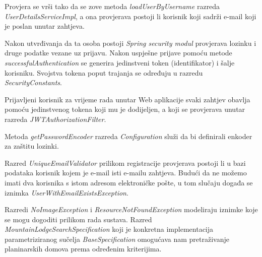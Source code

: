 			 Provjera se vrši tako da se zove metoda \textit{loadUserByUsername} razreda \textit{UserDetailsServiceImpl}, a ona provjerava postoji li korisnik koji sadrži e-mail koji je poslan unutar zahtjeva. 
			 
			 Nakon utvrđivanja da ta osoba postoji \textit{Spring security modul} provjerava lozinku i druge podatke vezane uz prijavu. Nakon uspješne prijave pomoću metode \textit{successfulAuthentication} se generira jedinstveni token (identifikator) i šalje korisniku. Svojstva tokena poput trajanja se određuju u razredu \textit{SecurityConstants}. 
			
			Prijavljeni korisnik za vrijeme rada unutar Web aplikacije svaki zahtjev obavlja pomoću jedinstvenog tokena koji mu je dodijeljen, a koji se provjerava unutar razreda \textit{JWTAuthorizationFilter}. 
			
			Metoda \textit{getPasswordEncoder} razreda \textit{Configuration} služi da bi definirali enkoder za zaštitu lozinki. 
			
			Razred \textit{UniqueEmailValidator} prilikom registracije provjerava postoji li u bazi podataka korisnik kojem je e-mail isti e-mailu zahtjeva. Budući da ne možemo imati dva korisnika s istom adresom elektroničke pošte, u tom slučaju događa se iznimka \textit{UserWithEmailExistsException}.  
			
			Razredi \textit{NoImageException} i \textit{ResourceNotFoundException} modeliraju iznimke koje se mogu dogoditi prilikom rada sustava.
			Razred \textit{MountainLodgeSearchSpecification} koji je konkretna implementacija parametriziranog sučelja \textit{BaseSpecification} omogućava nam pretraživanje planinarskih domova prema određenim kriterijima.
			
